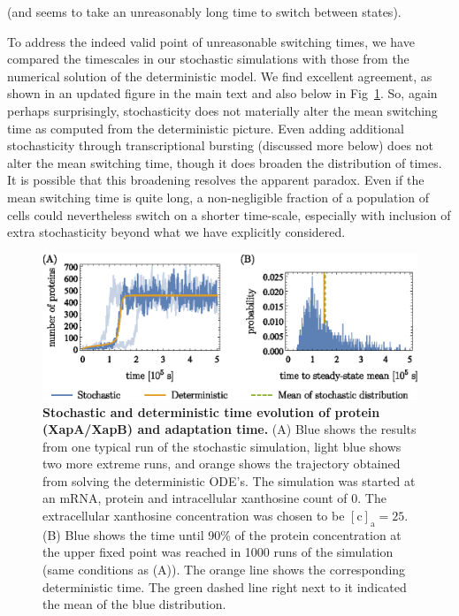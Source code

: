 \documentclass[11pt,letterpaper]{article}
\begin{document}
\begin{review}
	(and seems to take an unreasonably long time to switch between states).
\end{review}

\begin{response}
To address the indeed valid point of unreasonable switching times, we
have compared the timescales in our stochastic simulations with those from the
numerical solution of the deterministic model. We find excellent
agreement, as shown in an updated figure in the main text and also below
in Fig~\ref{adaptationtime}. So, again perhaps surprisingly,
stochasticity does not materially alter the mean switching time as
computed from the deterministic picture. Even adding additional
stochasticity through transcriptional bursting (discussed more below)
does not alter the mean switching time, though it does broaden the
distribution of times.
It is possible that this broadening resolves the apparent paradox. Even
if the mean switching time is quite long, a non-negligible fraction of a
population of cells could nevertheless switch on a shorter time-scale,
especially with inclusion of extra stochasticity beyond what we have
explicitly considered.
\end{response}

	\begin{figure}[h!]
		\centering
		\includegraphics{Fig9_evolution.eps}
		\caption{{\bf Stochastic and deterministic time evolution of protein (XapA/XapB) and adaptation time.}
			(A) Blue shows the results from one typical run of the stochastic simulation, light blue shows two more extreme runs, and orange shows the trajectory obtained from solving the deterministic ODE's. The simulation was started
			at an mRNA, protein and intracellular xanthosine count of 0. The
			extracellular xanthosine concentration was chosen to be
			$\mathrm{[c]_a} = 25$. (B) Blue shows the time until 90\% of the protein concentration at the upper fixed point was reached in 1000 runs of the simulation (same conditions as (A)). The orange line shows the corresponding deterministic time. The green dashed line right next to it indicated the mean of the blue distribution.}
		\label{adaptationtime}
	\end{figure}
\end{document}
